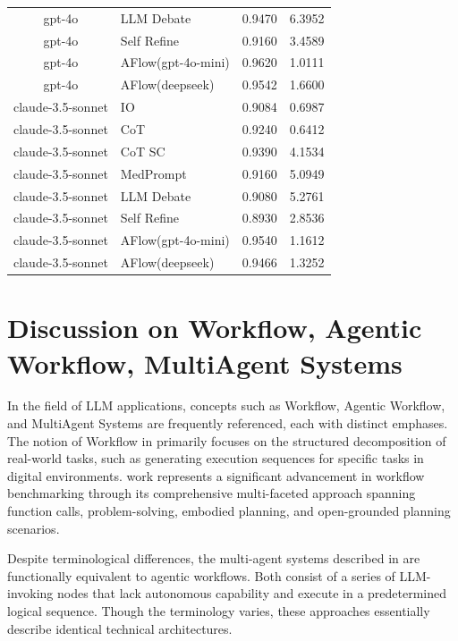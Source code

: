 \documentclass{article} %
\newcommand{\model}{{\sc AFlow}\xspace}
\theoremstyle{plain}
\theoremstyle{definition}
\theoremstyle{remark}
\begin{document}
\begin{table}[h]
\begin{tabular*}{\textwidth}{@{\extracolsep{\fill}}clcc@{}}
gpt-4o & LLM Debate & 0.9470 & 6.3952 \\
gpt-4o & Self Refine & 0.9160 & 3.4589 \\
gpt-4o & \model(gpt-4o-mini) & 0.9620 & 1.0111 \\
gpt-4o & \model(deepseek) & 0.9542 & 1.6600 \\
claude-3.5-sonnet & IO & 0.9084 & 0.6987 \\
claude-3.5-sonnet & CoT & 0.9240 & 0.6412 \\
claude-3.5-sonnet & CoT SC & 0.9390 & 4.1534 \\
claude-3.5-sonnet & MedPrompt & 0.9160 & 5.0949 \\
claude-3.5-sonnet & LLM Debate & 0.9080 & 5.2761 \\
claude-3.5-sonnet & Self Refine & 0.8930 & 2.8536 \\
claude-3.5-sonnet & \model(gpt-4o-mini) & 0.9540 & 1.1612 \\
claude-3.5-sonnet & \model(deepseek) & 0.9466 & 1.3252 \\
\hline
\end{tabular*}
\label{tab:model-performance}
\end{table}



\section{Discussion on Workflow, Agentic Workflow, MultiAgent Systems}
In the field of LLM applications, concepts such as Workflow, Agentic Workflow, and MultiAgent Systems are frequently referenced, each with distinct emphases. The notion of Workflow in \citep{qiao2025benchmark} primarily focuses on the structured decomposition of real-world tasks, such as generating execution sequences for specific tasks in digital environments. \citep{qiao2025benchmark} work represents a significant advancement in workflow benchmarking through its comprehensive multi-faceted approach spanning function calls, problem-solving, embodied planning, and open-grounded planning scenarios.


Despite terminological differences, the multi-agent systems described in \cite{zhang2024agentprune, zhang2024gdesigner, zhuge2024gptswarm} are functionally equivalent to agentic workflows. Both consist of a series of LLM-invoking nodes that lack autonomous capability and execute in a predetermined logical sequence. Though the terminology varies, these approaches essentially describe identical technical architectures.
\end{document}
